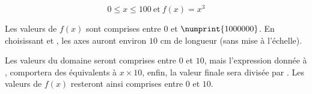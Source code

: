 \[
 0\leq x\leq 100 \ \text{et}\ f(x)=x^3
\]

Les valeurs de $f(x)$ sont comprises entre 0 et $\numprint{1000000}$. En choisissant  et , les axes auront environ $10$ cm de longueur (sans mise à l'échelle).

Les valeurs du domaine seront comprises entre $0$ et $10$, mais l'expression donnée à , comportera des   équivalents à $x \times 10$, enfin, la valeur finale  sera divisée par . Les valeurs de $f(x)$ resteront ainsi  comprises entre $0$ et $10$.

 \begin{tkzexample}[latex=10cm,small]
\end{tkzexample}




\endinput
